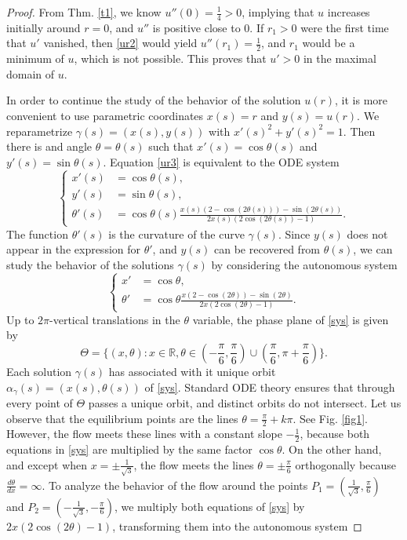 \documentclass[preprint,11pt]{elsarticle}
\theoremstyle{definition}
\def\r{\mathbb R}
\begin{document}
\begin{proof}
From Thm.   \ref{t1}, we know $u''(0)=\frac14>0$, implying  that $u$ increases initially around $r=0$, and $u''$ is positive close to $0$. If $r_1>0$ were the first time that $u'$ vanished, then \eqref{ur2} would yield $u''(r_1)=\frac12$, and $r_1$ would be a minimum of $u$, which is not possible. This proves that $u'>0$ in the maximal domain of $u$. 

In order to continue  the study of the behavior of the solution $u(r)$, it is more convenient to use  parametric coordinates   $x(s)=r$ and $y(s)=u(r)$. We reparametrize   $\gamma(s)=(x(s),y(s))$ with   $x'(s)^2+y'(s)^2=1$. Then   there is and angle $\theta=\theta(s)$ such that $x'(s)=\cos\theta(s)$ and $y'(s)=\sin\theta(s)$. Equation  \eqref{ur3} is equivalent to the ODE system
\begin{equation}\label{p1}
\left\{\begin{split}
x'(s)&=\cos\theta(s),\\
y'(s)&=\sin\theta(s),\\
\theta'(s)&=\cos\theta(s)\frac{x(s)(2-\cos(2\theta(s)))-\sin(2\theta(s))}{2x(s)(2\cos(2\theta(s))-1)}.
\end{split}\right.
\end{equation}
The function $\theta'(s)$ is the curvature of the curve $\gamma(s)$.  Since  $y(s)$ does not appear in the expression for $\theta'$, and   $y(s)$ can be recovered from $\theta(s)$, we can study the behavior of the solutions $\gamma(s)$ by considering the autonomous system 
\begin{equation}\label{sys}
\left\{\begin{split}
x'&=\cos\theta,\\
\theta'&=\cos\theta\frac{x(2-\cos(2\theta))-\sin(2\theta)}{2x(2\cos(2\theta)-1)}.
\end{split}\right.
\end{equation}
 Up to $2\pi$-vertical translations in the $\theta$ variable, the phase plane of \eqref{sys} is given by 
$$\Theta=\{(x,\theta)\colon x\in\r,\theta\in(-\frac{\pi}{6},\frac{\pi}{6})\cup (\frac{\pi}{6},\pi+\frac{\pi}{6})\}.$$
 Each solution $\gamma(s)$ has associated with it unique orbit $\alpha_\gamma(s)=(x(s),\theta(s))$ of \eqref{sys}. Standard ODE theory ensures that through every point of $\Theta$ passes a unique orbit, and distinct orbits do not intersect. Let us observe that the equilibrium points are the lines $\theta= \frac{\pi}{2}+k\pi$. See Fig. \ref{fig1}. However, the flow meets these lines with a constant slope  $-\frac12$, because both equations in \eqref{sys} are multiplied by the same factor $\cos\theta$. On the other hand, and except when $x=\pm \frac{1}{\sqrt{3}}$, the flow meets  the lines $\theta=\pm\frac{\pi}{6}$ orthogonally because $\frac{d\theta}{dx}=\infty$. To analyze the behavior of the flow around the points $P_1=(\frac{1}{\sqrt{3}},\frac{\pi}{6})$ and $P_2=(-\frac{1}{\sqrt{3}},-\frac{\pi}{6})$, we   multiply both equations of \eqref{sys}  by $2x(2\cos(2\theta)-1)$, transforming them into  the autonomous system 
 

\end{proof}
\end{document}
